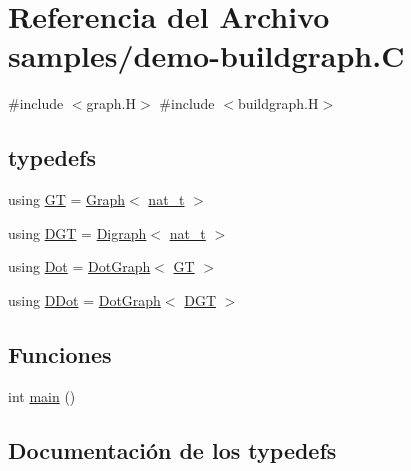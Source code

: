 \hypertarget{demo-buildgraph_8_c}{}\section{Referencia del Archivo samples/demo-\/buildgraph.C}
\label{demo-buildgraph_8_c}
{\ttfamily \#include $<$graph.\+H$>$}\newline
{\ttfamily \#include $<$buildgraph.\+H$>$}\newline
\subsection*{typedefs}
\begin{DoxyCompactItemize}
\item 
using \hyperlink{demo-buildgraph_8_c_a3001c40d2c31ca87ed96cd7d1334a55e}{GT} = \hyperlink{class_designar_1_1_graph}{Graph}$<$ \hyperlink{namespace_designar_aa72662848b9f4815e7bf31a7cf3e33d1}{nat\+\_\+t} $>$
\item 
using \hyperlink{demo-buildgraph_8_c_ae73e956c2a8cf0a58255aa6b659985e0}{D\+GT} = \hyperlink{class_designar_1_1_digraph}{Digraph}$<$ \hyperlink{namespace_designar_aa72662848b9f4815e7bf31a7cf3e33d1}{nat\+\_\+t} $>$
\item 
using \hyperlink{demo-buildgraph_8_c_a70657b0b48a4d69ef850be3c5517ecc2}{Dot} = \hyperlink{class_designar_1_1_dot_graph}{Dot\+Graph}$<$ \hyperlink{demo-buildgraph_8_c_a3001c40d2c31ca87ed96cd7d1334a55e}{GT} $>$
\item 
using \hyperlink{demo-buildgraph_8_c_a0ffdd103a7285712ccbd9548ff5544e7}{D\+Dot} = \hyperlink{class_designar_1_1_dot_graph}{Dot\+Graph}$<$ \hyperlink{demo-buildgraph_8_c_ae73e956c2a8cf0a58255aa6b659985e0}{D\+GT} $>$
\end{DoxyCompactItemize}
\subsection*{Funciones}
\begin{DoxyCompactItemize}
\item 
int \hyperlink{demo-buildgraph_8_c_ae66f6b31b5ad750f1fe042a706a4e3d4}{main} ()
\end{DoxyCompactItemize}


\subsection{Documentación de los \textquotesingle{}typedefs\textquotesingle{}}
\mbox{\label{demo-buildgraph_8_c_a0ffdd103a7285712ccbd9548ff5544e7}} 
